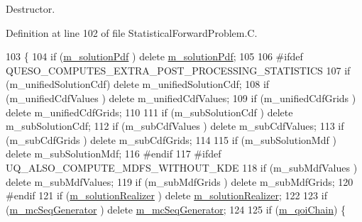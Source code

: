 Destructor. 



Definition at line 102 of file Statistical\-Forward\-Problem.\-C.


\begin{DoxyCode}
103 \{
104   \textcolor{keywordflow}{if} (\hyperlink{class_q_u_e_s_o_1_1_statistical_forward_problem_a67810b9d77e549b7eee76cc008e21e5b}{m\_solutionPdf}       ) \textcolor{keyword}{delete} \hyperlink{class_q_u_e_s_o_1_1_statistical_forward_problem_a67810b9d77e549b7eee76cc008e21e5b}{m\_solutionPdf};
105 
106 \textcolor{preprocessor}{#ifdef QUESO\_COMPUTES\_EXTRA\_POST\_PROCESSING\_STATISTICS}
107 \textcolor{preprocessor}{}  \textcolor{keywordflow}{if} (m\_unifiedSolutionCdf) \textcolor{keyword}{delete} m\_unifiedSolutionCdf;
108   \textcolor{keywordflow}{if} (m\_unifiedCdfValues  ) \textcolor{keyword}{delete} m\_unifiedCdfValues;
109   \textcolor{keywordflow}{if} (m\_unifiedCdfGrids   ) \textcolor{keyword}{delete} m\_unifiedCdfGrids;
110 
111   \textcolor{keywordflow}{if} (m\_subSolutionCdf    ) \textcolor{keyword}{delete} m\_subSolutionCdf;
112   \textcolor{keywordflow}{if} (m\_subCdfValues      ) \textcolor{keyword}{delete} m\_subCdfValues;
113   \textcolor{keywordflow}{if} (m\_subCdfGrids       ) \textcolor{keyword}{delete} m\_subCdfGrids;
114 
115   \textcolor{keywordflow}{if} (m\_subSolutionMdf    ) \textcolor{keyword}{delete} m\_subSolutionMdf;
116 \textcolor{preprocessor}{#endif}
117 \textcolor{preprocessor}{}\textcolor{preprocessor}{#ifdef UQ\_ALSO\_COMPUTE\_MDFS\_WITHOUT\_KDE}
118 \textcolor{preprocessor}{}  \textcolor{keywordflow}{if} (m\_subMdfValues      ) \textcolor{keyword}{delete} m\_subMdfValues;
119   \textcolor{keywordflow}{if} (m\_subMdfGrids       ) \textcolor{keyword}{delete} m\_subMdfGrids;
120 \textcolor{preprocessor}{#endif}
121 \textcolor{preprocessor}{}  \textcolor{keywordflow}{if} (\hyperlink{class_q_u_e_s_o_1_1_statistical_forward_problem_a0b855f085c84bd113827951f3c424d2d}{m\_solutionRealizer}  ) \textcolor{keyword}{delete} \hyperlink{class_q_u_e_s_o_1_1_statistical_forward_problem_a0b855f085c84bd113827951f3c424d2d}{m\_solutionRealizer};
122 
123   \textcolor{keywordflow}{if} (\hyperlink{class_q_u_e_s_o_1_1_statistical_forward_problem_a18f3f73759fbc2e64486b11c13b3fbf5}{m\_mcSeqGenerator}    ) \textcolor{keyword}{delete} \hyperlink{class_q_u_e_s_o_1_1_statistical_forward_problem_a18f3f73759fbc2e64486b11c13b3fbf5}{m\_mcSeqGenerator};
124 
125   \textcolor{keywordflow}{if} (\hyperlink{class_q_u_e_s_o_1_1_statistical_forward_problem_a0c7b7ce063c82ed96ea0a75d119a677a}{m\_qoiChain}) \{

\end{DoxyCode}
